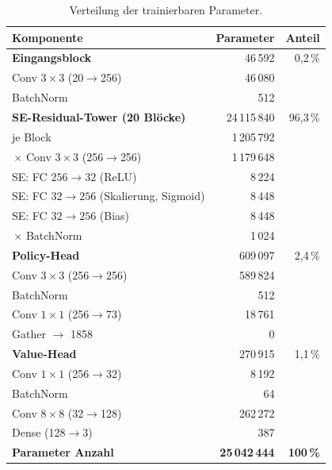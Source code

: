 \documentclass[
  a4paper, 12pt,
  parskip=half,
  headings=small,
  bibliography=totoc
]{scrartcl}
\begin{document}
\begin{table}[htbp]
  \centering
  \begin{tabular}{lrr}
    \toprule
    Komponente & Parameter & Anteil \\
    \midrule
    \textbf{Eingangsblock}                          & 46\,592      & 0{,}2\,\% \\
    \quad Conv \(3\times3\) (20\(\to\)256)          & 46\,080      & \\
    \quad BatchNorm                                 & 512          & \\
    \addlinespace
    \textbf{SE-Residual-Tower (20 Blöcke)}           & 24\,115\,840 & 96{,}3\,\% \\
    \quad je Block                                  & 1\,205\,792  & \\
    \quad\quad 2\,\(\times\) Conv \(3\times3\) (256\(\to\)256)  & 1\,179\,648 & \\
    \quad\quad SE: FC \(256\to32\) (ReLU)           & 8\,224       & \\
    \quad\quad SE: FC \(32\to256\) (Skalierung, Sigmoid) & 8\,448  & \\
    \quad\quad SE: FC \(32\to256\) (Bias)           & 8\,448       & \\
    \quad\quad 2\,\(\times\) BatchNorm              & 1\,024       & \\
    \addlinespace
    \textbf{Policy-Head}                            & 609\,097     & 2{,}4\,\% \\
    \quad Conv \(3\times3\) (256\(\to\)256)         & 589\,824     & \\
    \quad BatchNorm                                 & 512          & \\
    \quad Conv \(1\times1\) (256\(\to\)73)          & 18\,761      & \\
    \quad Gather \(\to\) 1858                       & 0            & \\
    \addlinespace
    \textbf{Value-Head}                             & 270\,915     & 1{,}1\,\% \\
    \quad Conv \(1\times1\) (256\(\to\)32)          & 8\,192       & \\
    \quad BatchNorm                                 & 64           & \\
    \quad Conv \(8\times8\) (32\(\to\)128)          & 262\,272     & \\
    \quad Dense (128\(\to\)3)                       & 387          & \\
    \midrule
    \textbf{Parameter Anzahl}                   & \textbf{25\,042\,444} & \textbf{100\,\%} \\
    \bottomrule
  \end{tabular}
  \caption{Verteilung der trainierbaren Parameter.}
  \label{tab:params}
\end{table}
\end{document}

